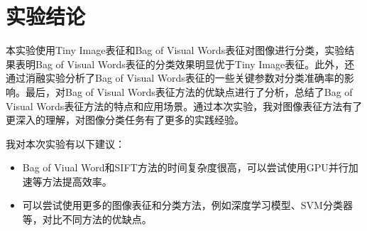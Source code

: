 \section{实验结论}

本实验使用Tiny Image表征和Bag of Visual Words表征对图像进行分类，实验结果表明Bag of Visual Words表征的分类效果明显优于Tiny Image表征。此外，还通过消融实验分析了Bag of Visual Words表征的一些关键参数对分类准确率的影响。最后，对Bag of Visual Words表征方法的优缺点进行了分析，总结了Bag of Visual Words表征方法的特点和应用场景。通过本次实验，我对图像表征方法有了更深入的理解，对图像分类任务有了更多的实践经验。

我对本次实验有以下建议：

\begin{itemize}
    \item Bag of Viual Word和SIFT方法的时间复杂度很高，可以尝试使用GPU并行加速等方法提高效率。
    \item 可以尝试使用更多的图像表征和分类方法，例如深度学习模型、SVM分类器等，对比不同方法的优缺点。
\end{itemize}